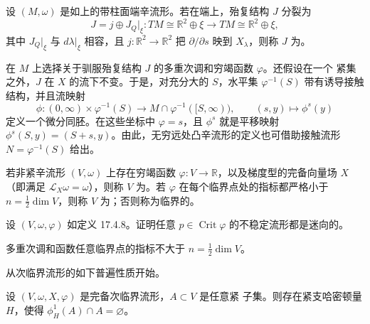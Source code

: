 \begin{definition}
\label{def:lambda-contact-type-J}
设 $(M,\omega)$ 是如上的带柱面端辛流形。若在端上，殆复结构 $J$ 分裂为
\[
 J=j\oplus J_Q|_\xi:T M\cong\mathbb R^2\oplus\xi
 \longrightarrow TM\cong\mathbb R^2\oplus\xi,
\]
其中 $J_Q|_\xi$ 与 $d\lambda|_\xi$ 相容，且
$j:\mathbb R^2\to\mathbb R^2$ 把 $\partial/\partial s$ 映到 $X_\lambda$，则称
$J$ 为\termLambdaContactType{}。
\end{definition}

在 $M$ 上选择关于驯服殆复结构 $J$ 的多重次调和穷竭函数 $\varphi$。还假设在一个
紧集之外，$J$ 在 $X$ 的流下不变。于是，对充分大的 $S$，水平集
$\varphi^{-1}(S)$ 带有诱导接触结构，并且流映射
\[
 \phi:(0,\infty)\times\varphi^{-1}(S)
 \to M\cap\varphi^{-1}([S,\infty)),
 \qquad(s,y)\longmapsto\phi^s(y)
\]
定义一个微分同胚。在这些坐标中 $\varphi=s$，且 $\phi^s$ 就是平移映射
$\phi^s(S,y)=(S+s,y)$。由此，无穷远处凸辛流形的定义也可借助接触流形
$N=\varphi^{-1}(S)$ 给出。

\begin{definition}
\label{def:weinstein-subcritical}
若非紧辛流形 $(V,\omega)$ 上存在穷竭\personMorse{}函数
$\varphi:V\to\mathbb R$，以及梯度型的完备\personLiouville{}向量场 $X$（即满足
$\mathcal L_X\omega=\omega$），则称 $V$ 为\termWeinsteinManifold{}。若
$\varphi$ 在每个临界点处的\personMorse{}指标都严格小于
$n=\frac12\dim V$，则称 $V$ 为\termSubcritical{}；否则称为临界的。
\end{definition}

\begin{exercise}
\label{ex:unstable-manifold-isotropic}
设 $(V,\omega,\varphi)$ 如定义 17.4.8。证明任意
$p\in\operatorname{Crit}\varphi$ 的不稳定流形都是迷向的。
\end{exercise}

\begin{corollary}
\label{cor:psh-morse-index-bound}
多重次调和函数任意临界点的\personMorse{}指标不大于
$n=\frac12\dim V$。
\end{corollary}

从次临界\personWeinstein{}流形的如下普遍性质开始。

\begin{proposition}[{(BCi02) 引理 3.2}]
\label{prop:compact-set-displaceable-subcritical}
设 $(V,\omega,X,\varphi)$ 是完备次临界\personWeinstein{}流形，$A\subset V$ 是任意紧
子集。则存在紧支哈密顿量 $H$，使得 $\phi_H^1(A)\cap A=\varnothing$。
\end{proposition}

